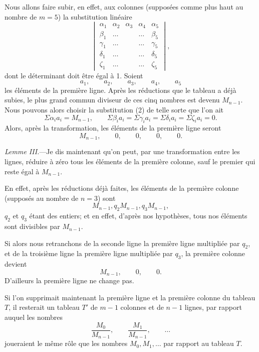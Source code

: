 \documentclass{article}
\begin{document}
Nous allons faire subir, en effet, aux colonnes (supposées comme plus haut au nombre de $m = 5$) la substitution linéaire
\[ \begin{vmatrix} \alpha_{1} & \alpha_{2} & \alpha_{3} & \alpha_{4} & \alpha_{5} \\[1ex] \beta_{1} & \ldots & & \ldots & \beta_{5} \\[1ex] \gamma_{1} & \ldots & & \ldots & \gamma_{5} \\[1ex] \delta_{1} & \ldots & & \ldots & \delta_{5} \\[1ex] \zeta_{1} & \ldots & & \ldots & \zeta_{5} \end{vmatrix}, \tag{2} \]
dont le déterminant doit être égal à 1. Soient
\[ a_{1}, \qquad a_{2}, \qquad a_{3}, \qquad a_{4}, \qquad a_{5} \]
les éléments de la première ligne. Après les réductions que le tableau a déjà subies, le plus grand commun diviseur de ces cinq nombres est devenu $M_{n-1}$. Nous pouvons alors choisir la substitution (2) de telle sorte que l'on ait
\[ \Sigma \alpha_{i} a_{i} = M_{n-1}, \qquad \Sigma \beta_{i} a_{i} = \Sigma \gamma_{i} a_{i} = \Sigma \delta_{i} a_{i} = \Sigma \zeta_{i} a_{i} = 0. \]
Alors, après la transformation, les éléments de la première ligne seront
\[ M_{n-1}, \qquad 0, \qquad 0, \qquad 0, \qquad 0. \]

\emph{Lemme III.}---Je dis maintenant qu'on peut, par une transformation entre les lignes, réduire à zéro tous les éléments de la première colonne, sauf le premier qui reste égal à $M_{n-1}$.

En effet, après les réductions déjà faites, les éléments de la première colonne (supposés au nombre de $n = 3$) sont
\[ M_{n-1}, q_{2} M_{n-1}, q_{3} M_{n-1}, \]
$q_{2}$ et $q_{3}$ étant des entiers; et en effet, d'après nos hypothèses, tous nos éléments sont divisibles par $M_{n-1}$.

Si alors nous retranchons de la seconde ligne la première ligne multipliée par $q_{2}$, et de la troisième ligne la première ligne multipliée par $q_{3}$, la première colonne devient
\[ M_{n-1}, \qquad 0, \qquad 0. \]
D'ailleurs la première ligne ne change pas.

Si l'on supprimait maintenant la première ligne et la première colonne du tableau $T$, il resterait un tableau $T'$ de $m-1$ colonnes et de $n-1$ lignes, par rapport auquel les nombres
\[ \frac{M_{0}}{M_{n-1}}, \qquad \frac{M_{1}}{M_{n-1}}, \qquad \ldots \]
joueraient le même rôle que les nombres $M_{0}, M_{1}, \ldots$ par rapport au tableau $T$.
\end{document}
